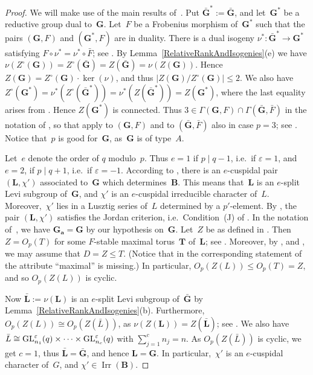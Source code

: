 \documentclass[12pt]{amsart}
\newcommand{\bG}{{\mathbf{G}}}      %
\newcommand{\bB}{{\mathbf{B}}}
\newcommand{\bL}{{\mathbf{L}}}
\newcommand{\bT}{{\mathbf{T}}}
\def\GL{ \text{\rm GL} }
\DeclareMathOperator{\Irr}{Irr}
\theoremstyle{theorem}
\theoremstyle{definition}
\theoremstyle{remark}
\begin{document}
\begin{proof}
We will make use of the main results 
of~\cite{CaEn99}. Put $\bar{\bG}^* := \bar{\bG}$, and let~$\bG^*$ be a reductive 
group dual to~$\bG$. Let~$F$ be a Frobenius morphism of~$\bG^*$ such that the 
pairs $(\bG, F)$ and $(\bG^*,F)$ are in duality.
There is a dual isogeny $\nu^*: \bar{\bG}^* \rightarrow \bG^*$ satisfying
$F \circ \nu^* = \nu^* \circ \bar{F}$; see \cite[Proposition~$11.1.11$]{DiMi2}. 
By Lemma~\ref{RelativeRankAndIsogenies}(e) we have $\nu( Z^{\circ}( \bG ) ) = 
Z^{\circ}( \bar{\bG} ) = Z( \bar{\bG} ) = \nu( Z( \bG ) )$. Hence $Z( \bG ) = 
Z^{\circ}( \bG ) \cdot \ker( \nu )$, and thus 
$|Z( \bG )/Z^{\circ}( \bG )| \leq 2$. We also have $Z^{\circ}( \bG^* ) =
\nu^*( Z^{\circ}( \bar{\bG}^* ) ) = \nu^*( Z( \bar{\bG}^* ) ) = Z( \bG^* )$, 
where the last equality arises from \cite[$1.3.10$(c)]{GeMa}. Hence $Z( \bG^* )$ 
is connected. Thus $3 \in \Gamma( \bG, F) \cap \Gamma( \bar{\bG}, \bar{F})$ in 
the notation of \cite[Definition-Notation~$4.3$]{CaEn99}, so that 
\cite[Theorems~$4.1$,~$4.2$]{CaEn99} apply to $( \bG, F)$ and to 
$( \bar{\bG}, \bar{F})$ also in case $p = 3$; see 
\cite[Subsection~$5.2$]{CaEn99}. Notice that~$p$ is good for~$\bG$, as~$\bG$ is 
of type~$A$.

Let~$e$ denote the order of $q$ modulo~$p$. Thus $e = 1$ if $p \mid q - 1$,
i.e.\ if $\varepsilon = 1$, and $e = 2$, if $p \mid q + 1$, i.e.\ if 
$\varepsilon = -1$. According to \cite[Theorem]{CaEn99}, there is an
$e$-cuspidal pair $(\bL, \chi')$ associated to~$\bG$ which determines~$\bB$.
This means that~$\bL$ is an $e$-split Levi subgroup of~$\bG$, and $\chi'$ is 
an $e$-cuspidal irreducible character of~$L$. Moreover,~$\chi'$ lies in a
Lusztig series of~$L$ determined by a $p'$-element. By
\cite[Theorem~$4.2$]{CaEn99}, the pair $(\bL,\chi')$ satisfies the Jordan
criterion, i.e.\ Condition~(J) of \cite[Subsection~$1.3$]{CaEn99}. In the 
notation of~\cite{CaEn99}, we have $\bG_{\mathbf{a}} = \bG$ by our hypothesis 
on~$\bG$. Let~$Z$ be as defined in \cite[Definition-Notation~$4.3$ and 
Definition~$4.6$]{CaEn99}. Then $Z = O_p( T )$ for some $F$-stable maximal
torus~$\bT$ of~$\bL$; see \cite[Lemma~$4.8$]{CaEn99}. Moreover, 
by \cite[Definition~$4.9$]{CaEn99}, and \cite[Lemma~$4.16$]{CaEn99}, we may
assume that $D = Z \leq T$. (Notice that in the corresponding statement of
\cite[Lemma~$4.16$]{CaEn99} the attribute ``maximal'' is missing.) In 
particular, $O_p( Z( L ) ) \leq O_p( T ) = Z$, and so $O_p( Z( L ) )$ is 
cyclic.

Now $\bar{\bL} := \nu(\bL)$ is an $e$-split Levi subgroup of~$\bar{\bG}$ by
Lemma~\ref{RelativeRankAndIsogenies}(b). Furthermore, 
$O_p( Z( L ) ) \cong O_p( Z( \bar{L} ) )$, as 
$\nu( Z( \bL ) ) = Z( \bar{\bL} )$; see \cite[$1.3.10$(c)]{GeMa}. We also have
$\bar{L} \cong \GL_{n_1}^\varepsilon( q ) \times \cdots \times 
\GL_{n_c}^\varepsilon( q )$ with $\sum_{j= 1}^c n_j = n$. As 
$O_p( Z( \bar{L} ) )$ is cyclic, we get $c = 1$, thus $\bar{\bL} = \bar{\bG}$, 
and hence $\bL = \bG$. In particular,~$\chi'$ is an $e$-cuspidal character 
of~$G$, and $\chi' \in \Irr( \bB )$. 


\end{proof}
\end{document}
